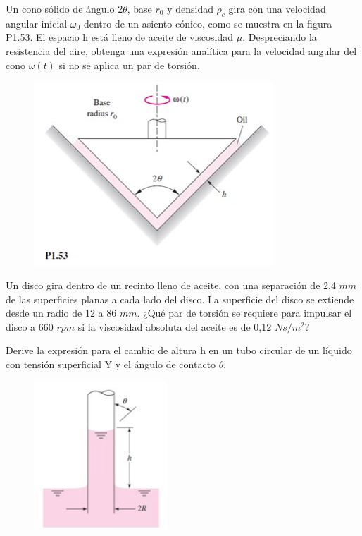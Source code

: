 \documentclass[12pt, a4paper]{exam}
\begin{document}
\begin{questions}
 
	\question Un cono sólido de ángulo 2$\theta$, base $r_0$ y densidad $\rho_c$ gira con una velocidad angular inicial $\omega_0$ dentro de un asiento cónico, como se muestra en la figura P1.53. El espacio h está lleno de aceite de viscosidad $\mu$. Despreciando la resistencia del aire, obtenga una expresión analítica para la velocidad angular del cono $\omega(t)$ si no se aplica un par de torsión.
    \begin{figure}[h]
    \includegraphics[width=9cm]{1.53.jpg}
    \centering

    \end{figure}		
\newpage

 
 
	\question Un disco gira dentro de un recinto lleno de aceite, con una separación de 2,4 $mm$ de las superficies planas a cada lado del disco. La superficie del disco se extiende desde un radio de 12 a 86 $mm$. ¿Qué par de torsión se requiere para impulsar el disco a 660 $rpm$ si la viscosidad absoluta del aceite es de 0,12 $N s/m^2$?
    
	\question  Derive la expresión para el cambio de altura h en un tubo circular de un líquido con tensión superficial Y y el ángulo de contacto $\theta$.
		
    \begin{figure}[h]
    \includegraphics[width=5cm]{TUBO.jpg}
    \centering
    \end{figure}


\end{questions}
\end{document}

